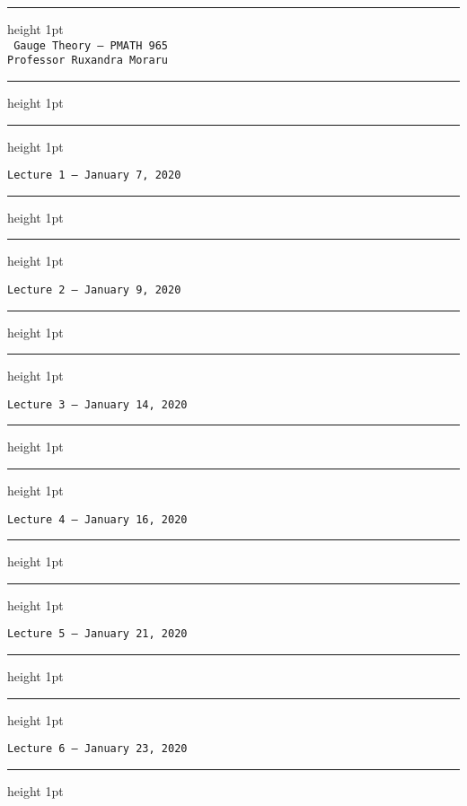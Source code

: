 \documentclass[10pt]{article}
\def\hrulefill{\noindent\leavevmode\leaders\hrule height 1pt\hfill\kern\z}
\theoremstyle{definition}
\newcommand\lecture[3]
{
    \hrulefill{}
    \vspace{1em}
    \begin{center}
        \noindent \texttt{\Large Lecture #1 --- #2 #3, 2020} 
    \end{center}
    \vspace{0.55em}
    \hrulefill{}
    \vspace{1em}
    \\
}
\begin{document}
\pagestyle{plain}

\begin{center}
    \hrulefill{} \\
    \vspace{1.5em}
    \texttt{ \LARGE Gauge Theory --- PMATH 965} \\
    \vspace{0.5em}
    \texttt{\Large Professor Ruxandra Moraru} \\ 
    \vspace{0.5em}
    \hrulefill{}
\end{center}

\tableofcontents
\vspace{1em}

\lecture{1}{January}{7}
\lecture{2}{January}{9}
\lecture{3}{January}{14}
\lecture{4}{January}{16}
\lecture{5}{January}{21}
\lecture{6}{January}{23}
\end{document}
